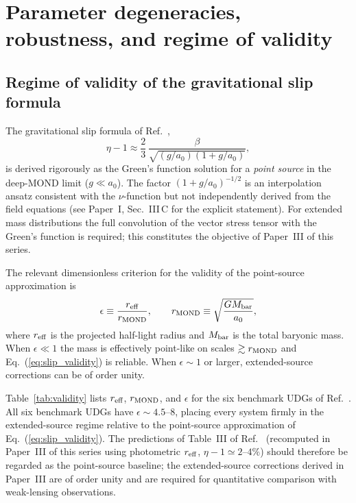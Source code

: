 \documentclass[aps,prd,reprint,floatfix,nofootinbib,superscriptaddress]{revtex4-2}
\newcommand{\aO}{a_0}
\begin{document}
\section{Parameter degeneracies, robustness, and regime of validity}
\label{sec:degeneracies}

\subsection{Regime of validity of the gravitational slip formula}
\label{sec:eta_validity}

The gravitational slip formula of Ref.~\cite{Mendes2026},
\begin{equation}
  \eta - 1 \approx \frac{2}{3}\,
  \frac{\beta}{\sqrt{(g/\aO)(1+g/\aO)}},
  \label{eq:slip_validity}
\end{equation}
is derived rigorously as the Green's function solution for a
\emph{point source} in the deep-MOND limit ($g \ll \aO$). The
factor $(1+g/\aO)^{-1/2}$ is an interpolation ansatz consistent
with the $\nu$-function but not independently derived from the field
equations (see Paper~I, Sec.~III\,C for the explicit statement).
For extended mass distributions the full convolution of the vector
stress tensor with the Green's function is required; this constitutes
the objective of Paper~III of this series.

The relevant dimensionless criterion for the validity of the
point-source approximation is
\begin{equation}
  \epsilon \equiv \frac{r_{\rm eff}}{r_{\rm MOND}},
  \qquad
  r_{\rm MOND} \equiv \sqrt{\frac{GM_{\rm bar}}{\aO}},
  \label{eq:epsilon}
\end{equation}
where $r_{\rm eff}$ is the projected half-light radius and
$M_{\rm bar}$ is the total baryonic mass. When $\epsilon \ll 1$
the mass is effectively point-like on scales $\gtrsim r_{\rm MOND}$
and Eq.~(\ref{eq:slip_validity}) is reliable. When $\epsilon \sim 1$
or larger, extended-source corrections can be of order unity.

Table~\ref{tab:validity} lists $r_{\rm eff}$, $r_{\rm MOND}$, and
$\epsilon$ for the six benchmark UDGs of Ref.~\cite{Mendes2026}.
All six benchmark UDGs have $\epsilon \sim 4.5$--$8$, placing every
system firmly in the extended-source regime relative to the
point-source approximation of Eq.~(\ref{eq:slip_validity}). The
predictions of Table~III of Ref.~\cite{Mendes2026} (recomputed in
Paper~III of this series using photometric $r_{\rm eff}$,
$\eta - 1 \simeq 2$--$4\%$) should therefore be regarded as the
point-source baseline; the extended-source corrections derived in
Paper~III are of order unity and are required for quantitative
comparison with weak-lensing observations.
\end{document}
